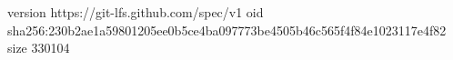 version https://git-lfs.github.com/spec/v1
oid sha256:230b2ae1a59801205ee0b5ce4ba097773be4505b46c565f4f84e1023117e4f82
size 330104

